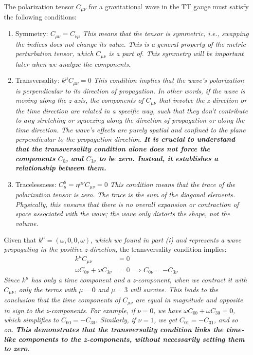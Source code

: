 \documentclass{article}
\begin{document}
The polarization tensor $C_{\mu \nu}$ for a gravitational wave in the TT gauge must satisfy the following conditions:
\begin{enumerate}
    \item Symmetry: $C_{\mu \nu} = C_{\nu \mu}$ \emph{This means that the tensor is symmetric, i.e., swapping the indices does not change its value. This is a general property of the metric perturbation tensor, which $C_{\mu\nu}$ is a part of. This symmetry will be important later when we analyze the components.}
    \item Transversality: $k^{\mu} C_{\mu \nu} = 0$ \emph{This condition implies that the wave's polarization is perpendicular to its direction of propagation. In other words, if the wave is moving along the z-axis, the components of $C_{\mu\nu}$ that involve the z-direction or the time direction are related in a specific way, such that they don't contribute to any stretching or squeezing along the direction of propagation or along the time direction. The wave's effects are purely spatial and confined to the plane perpendicular to the propagation direction.} \emph{\textbf{It is crucial to understand that the transversality condition alone does not force the components $C_{0\nu}$ and $C_{3\nu}$ to be zero. Instead, it establishes a relationship between them.}}
    \item Tracelessness: $C^{\mu}_{\mu} = \eta^{\mu \nu} C_{\mu \nu} = 0$ \emph{This condition means that the trace of the polarization tensor is zero. The trace is the sum of the diagonal elements. Physically, this ensures that there is no overall expansion or contraction of space associated with the wave; the wave only distorts the shape, not the volume.}
\end{enumerate}
Given that $k^{\mu} = (\omega, 0, 0, \omega)$, \emph{which we found in part (i) and represents a wave propagating in the positive z-direction}, the transversality condition implies:
\begin{align}
k^{\mu}C_{\mu \nu} &= 0 \\
\omega C_{0\nu} + \omega C_{3\nu} &= 0 \implies C_{0\nu} = -C_{3\nu}
\end{align}
\emph{Since $k^{\mu}$ has only a time component and a z-component, when we contract it with $C_{\mu\nu}$, only the terms with $\mu=0$ and $\mu=3$ will survive. This leads to the conclusion that the time components of $C_{\mu\nu}$ are equal in magnitude and opposite in sign to the z-components.}
\emph{For example, if $\nu=0$, we have $\omega C_{00} + \omega C_{30} = 0$, which simplifies to $C_{00} = -C_{30}$. Similarly, if $\nu=1$, we get $C_{01} = -C_{31}$, and so on. \textbf{This demonstrates that the transversality condition links the time-like components to the z-components, without necessarily setting them to zero.}}
\end{document}
